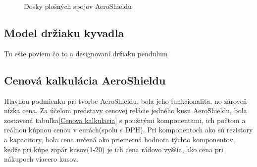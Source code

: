 \begin{figure}
	\hfill
	\hfill
	\hfill
	\caption{Dosky plošných spojov AeroShieldu}\label{OBRAZOK 2.7}
\end{figure}

\subsection{Model držiaku kyvadla}

Tu ešte poviem čo to a designovaní držiaku pendulum

\subsection{Cenová kalkulácia AeroShieldu}

Hlavnou podmienku pri tvorbe AeroShieldu, bola jeho funkcionalita, no zároveň nízka cena. Za účelom predstavy cenovej relácie jedného kusu AeroShieldu, bola zostavená tabuľka\ref{Cenova kalkulacia} s použitými komponentami, ich počtom a reálnou kúpnou cenou v eurách(spolu s DPH). Pri komponentoch ako sú rezistory a kapacitory, bola cena určená ako priemerná hodnota týchto komponentov, keďže pri kúpe zopár kusov(1-20) je ich cena rádovo vyššia, ako cena pri nákupoch viacero kusov. 

